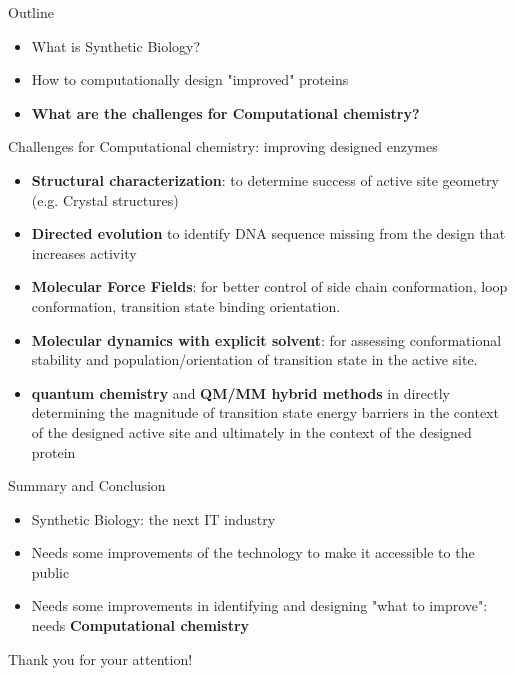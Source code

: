 \begin{frame}{Outline}
\footnotesize
\begin{itemize}
\item What is Synthetic Biology?
\item How to computationally design "improved" proteins
\item \textbf{What are the challenges for Computational chemistry?}
\end{itemize}
\end{frame}

\begin{frame}{Challenges for Computational chemistry: improving designed enzymes}
\footnotesize
\begin{itemize}
\item \textbf{Structural characterization}: to determine success of active site geometry (e.g. Crystal structures)
\item \textbf{Directed evolution} to identify DNA sequence missing from the design that increases activity 
\item \textbf{Molecular Force Fields}: for better control of side chain conformation, loop conformation, transition state binding orientation.
\item \textbf{Molecular dynamics with explicit solvent}: for assessing conformational stability and population/orientation of transition state in the active site.
\item \textbf{quantum chemistry} and \textbf{QM/MM hybrid methods} in directly determining the magnitude of transition state energy barriers in the context of the designed
active site and ultimately in the context of the designed protein

\end{itemize}
\end{frame}

\begin{frame}{Summary and Conclusion}
\footnotesize
\begin{itemize}
\item Synthetic Biology: the next IT industry
\item Needs some improvements of the technology to make it accessible to the public 
\item Needs some improvements in identifying and designing "what to improve":  needs \textbf{Computational chemistry}
\end{itemize}
\begin{center}
{\red Thank you for your attention!}
\end{center}
\end{frame}
